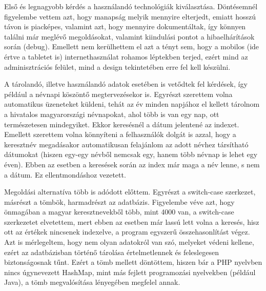 
Első és legnagyobb kérdés a használandó technológiák kiválasztása. Döntésemnél figyelembe vettem azt, hogy manapság melyik mennyire elterjedt, emiatt hosszú távon is piacképes, valamint azt, hogy mennyire dokumentáltak, így könnyen találni már meglévő megoldásokat, valamint kiindulási pontot a hibaelhárítások során (debug). Emellett nem kerülhettem el azt a tényt sem, hogy a mobilos (ide értve a tabletet is) internethasználat rohamos léptekben terjed, ezért mind az adminisztrációs felület, mind a design tekintetében erre fel kell készülni.


A tárolandó, illetve használandó adatok esetében is vetődtek fel kérdések, így például a névnapi köszöntő megtervezésekor is. Egyrészt szerettem volna automatikus üzeneteket küldeni, tehát az év minden napjához el kellett tárolnom a hivatalos magyarországi névnapokat, ahol több is van egy nap, ott természetesen mindegyiket. Ekkor keresésnél a dátum jelentené az indexet. Emellett szerettem volna könnyíteni a felhasználók dolgát is azzal, hogy a keresztnév megadásakor automatikusan felajánlom az adott névhez társítható dátumokat (hiszen egy-egy névből nemcsak egy, hanem több névnap is lehet egy éven). Ebben az esetben a keresések során az index már maga a név lenne, s nem a dátum. Ez ellentmondáshoz vezetett.

Megoldási alternatíva több is adódott előttem. Egyrészt a switch-case szerkezet, másrészt a tömbök, harmadrészt az adatbázis. Figyelembe véve azt, hogy önmagában a magyar keresztnevekből több, mint 4000 van, a switch-case szerkezetet elvetettem, mert ebben az esetben már lassú lett volna a keresés, hisz ott az értékek nincsenek indexelve, a program egyszerű összehasonlítást végez. Azt is mérlegeltem, hogy nem olyan adatokról van szó, melyeket védeni kellene, ezért az adatbázisban történő tárolása értelmetlennek és feleslegesen biztonságosnak tűnt. Ezért a tömb mellett döntöttem, hiszen bár a PHP nyelvben nincs úgynevezett HashMap, mint más fejlett programozási nyelvekben (például Java), a tömb megvalósítása lényegében megfelel annak.